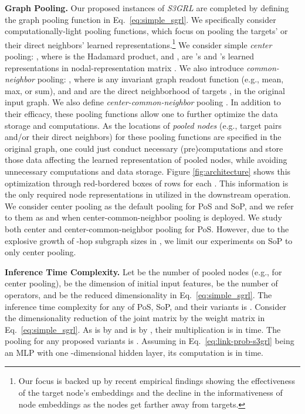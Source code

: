 \documentclass[sigconf, nonacm]{acmart}
\newcommand{\posplus}{\xspace}
\newcommand{\pos}{{P\lowercase{o}S}\xspace}
\newcommand{\sop}{{S\lowercase{o}P}\xspace}
\newcommand{\sopplus}{\xspace}
\newcommand{\ssgrl}{\textit{S3GRL}\xspace}
\begin{document}
\vskip 1mm
\noindent \textbf{Graph Pooling.} Our proposed instances of \ssgrl are completed by defining the graph pooling function in Eq.~\ref{eq:simple_sgrl}. We specifically consider computationally-light pooling functions, which focus on pooling the targets' or their direct neighbors' learned representations.\footnote{Our focus is backed up by recent empirical findings \cite{chamberlain2023graph} showing the effectiveness of the target node's embeddings and the decline in the informativeness of node embeddings as the nodes get farther away from targets.} We consider simple \textit{center} pooling: , where  is the Hadamard product, and ,  are 's and 's learned representations in nodal-representation matrix . We also introduce \textit{common-neighbor} pooling: , where  is any invariant graph readout function (e.g., mean, max, or sum), and  and  are the direct neighborhood of targets ,  in the original input graph. We also define \textit{center-common-neighbor} pooling . In addition to their efficacy, these pooling functions allow one to further optimize the data storage and computations. As the locations of \textit{pooled nodes} (e.g., target pairs and/or their direct neighbors) for these pooling functions are specified in the original graph, one could just conduct necessary (pre)computations and store those data affecting the learned representation of pooled nodes, while avoiding unnecessary computations and data storage. Figure \ref{fig:architecture} shows this optimization through red-bordered boxes of rows for each . This information is the only required node representations in  utilized in the downstream  operation. We consider center pooling as the default pooling for \pos and \sop, and we refer to them as \posplus and \sopplus when center-common-neighbor pooling is deployed. We study both center and center-common-neighbor pooling for \pos. However, due to the explosive growth of -hop subgraph sizes in \sopplus, we limit our experiments on \sop to only center pooling. 



\vskip 1mm
\noindent \textbf{Inference Time Complexity.} Let  be the number of pooled nodes (e.g.,  for center pooling),  be the dimension of initial input features,  be the number of operators, and  be the reduced dimensionality in Eq.~\ref{eq:simple_sgrl}. The inference time complexity for any of \pos, \sop, and their variants is . Consider the dimensionality reduction of the joint matrix  by the weight matrix  in Eq.~\ref{eq:simple_sgrl}. As  is  by  and  is  by , their multiplication is in  time. The pooling for any proposed variants is . Assuming  in Eq.~\ref{eq:link-prob-s3grl} being an MLP with one -dimensional hidden layer, its computation is in  time.
\end{document}
